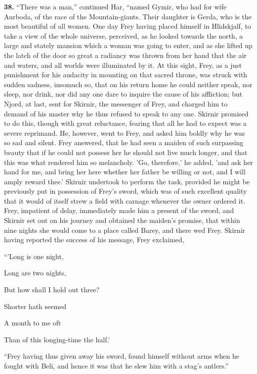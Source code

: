 \textbf{38.} ``There was a man,'' continued Har, ``named Gymir, who had for wife
Aurboda, of the race of the Mountain-giants. Their daughter is Gerda,
who is the most beautiful of all women. One day Frey having placed
himself in Hlidskjalf, to take a view of the whole universe,
perceived, as he looked towards the north, a large and stately mansion
which a woman was going to enter, and as she lifted up the latch of
the door so great a radiancy was thrown from her hand that the air and
waters, and all worlds were illuminated by it. At this sight, Frey, as
a just punishment for his audacity in mounting on that sacred throne,
was struck with sudden sadness, insomuch so, that on his return home
he could neither speak, nor sleep, nor drink, nor did any one dare to
inquire the cause of his affliction; but Njord, at last, sent for
Skirnir, the messenger of Frey, and charged him to demand of his
master why he thus refused to speak to any one. Skirnir promised to do
this, though with great reluctance, fearing that all he had to expect
was a severe reprimand. He, however, went to Frey, and asked him
boldly why he was so sad and silent. Frey answered, that he had seen a
maiden of such surpassing beauty that if he could not possess her he
should not live much longer, and that this was what rendered him so
melancholy. 'Go, therefore,' he added, 'and ask her hand for me, and
bring her here whether her father be willing or not, and I will amply
reward thee.' Skirnir undertook to perform the task, provided he might
be previously put in possession of Frey's sword, which was of such
excellent quality that it would of itself strew a field with carnage
whenever the owner ordered it. Frey, impatient of delay, immediately
made him a present of the sword, and Skirnir set out on his journey
and obtained the maiden's promise, that within nine nights she would
come to a place called Barey, and there wed Frey. Skirnir having
reported the success of his message, Frey exclaimed,

``'Long is one night,

Long are two nights,

But how shall I hold out three?

Shorter hath seemed

A month to me oft

Than of this longing-time the half.'

``Frey having thus given away his sword, found himself without arms
when he fought with Beli, and hence it was that he slew him with a
stag's antlers.''

